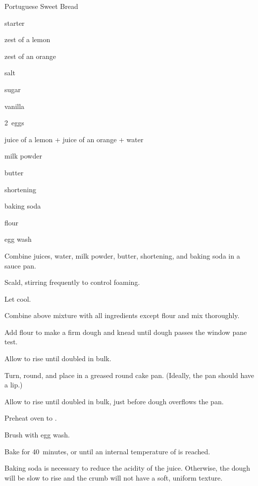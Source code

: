 \begin{recipe}{Portuguese Sweet Bread}{}{}

\begin{ingredients}
\item {} starter
\item zest of a lemon
\item zest of an orange
\item {} salt
\item {} sugar
\item {} vanilla
\item 2~eggs
\item {} juice of a lemon + juice of an orange + water
\item {} milk powder
\item {} butter
\item {} shortening
\item {} baking soda
\item {} flour
\item egg wash
\end{ingredients}

\begin{directions}
\item Combine juices, water, milk powder, butter, shortening, and baking soda in a sauce pan.
\item Scald, stirring frequently to control foaming.
\item Let cool.
\item Combine above mixture with all ingredients except flour and mix thoroughly.
\item Add flour to make a firm dough and knead until dough passes the window pane test.
\item Allow to rise until doubled in bulk.
\item Turn, round, and place in a greased round cake pan. (Ideally, the pan should have a lip.)
\item Allow to rise until doubled in bulk, just before dough overflows the pan.
\item Preheat oven to .
\item Brush with egg wash.
\item Bake for 40~minutes, or until an internal temperature of  is reached.
\end{directions}

\item{Baking soda is necessary to reduce the acidity of the juice. Otherwise, the dough will be slow to rise and the crumb will not have a soft, uniform texture.}
\end{recipe}
